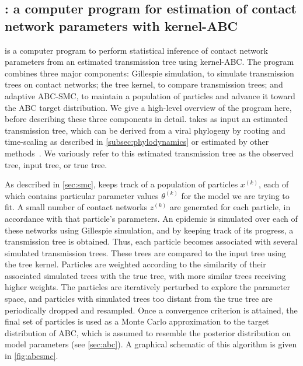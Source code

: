 \subsection{: a computer program for estimation of contact
network parameters with kernel-ABC}

 is a computer program to perform statistical inference of
contact network parameters from an estimated transmission tree using
kernel-\gls{ABC}. The program combines three major components: Gillespie
simulation, to simulate transmission trees on contact networks; the tree
kernel, to compare transmission trees; and adaptive \gls{ABC}-\gls{SMC}, to
maintain a population of particles and advance it toward the \gls{ABC} target
distribution. We give a high-level overview of the program here, before
describing these three components in detail.  takes as input
an estimated transmission tree, which can be derived from a viral phylogeny by
rooting and time-scaling as described in \cref{subsec:phylodynamics} or
estimated by other methods~\autocite{cottam2008integrating,
jombart2011reconstructing, ypma2012unravelling, morelli2012bayesian,
didelot2014bayesian}. We variously refer to this estimated transmission tree as
the observed tree, input tree, or true tree.

As described in \cref{sec:smc},  keeps track of a population
of particles $x^{(k)}$, each of which contains particular parameter values
$\theta^{(k)}$ for the model we are trying to fit. A small number of contact
networks $z^{(k)}$ are generated for each particle, in accordance with that
particle's parameters. An epidemic is simulated over each of these networks
using Gillespie simulation, and by keeping track of its progress, a
transmission tree is obtained. Thus, each particle becomes associated with
several simulated transmission trees. These trees are compared to the input
tree using the tree kernel. Particles are weighted according to the similarity
of their associated simulated trees with the true tree, with more similar trees
receiving higher weights. The particles are iteratively perturbed to explore
the parameter space, and particles with simulated trees too distant from the
true tree are periodically dropped and resampled. Once a convergence criterion
is attained, the final set of particles is used as a Monte Carlo approximation
to the target distribution of \gls{ABC}, which is assumed to resemble the
posterior distribution on model parameters (see \cref{sec:abc}). A graphical
schematic of this algorithm is given in \cref{fig:abcsmc}.

